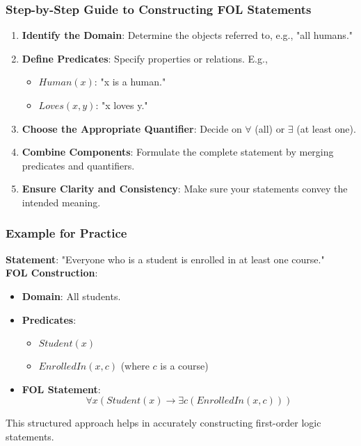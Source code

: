\documentclass[aspectratio=169]{beamer}
\begin{document}
\begin{frame}[fragile]
    \frametitle{Step-by-Step Guide to Constructing FOL Statements}
    \begin{enumerate}
        \item \textbf{Identify the Domain}: Determine the objects referred to, e.g., "all humans."
        \item \textbf{Define Predicates}: Specify properties or relations. E.g.,
        \begin{itemize}
            \item \( Human(x) \): "x is a human."
            \item \( Loves(x, y) \): "x loves y."
        \end{itemize}
        \item \textbf{Choose the Appropriate Quantifier}: Decide on \( \forall \) (all) or \( \exists \) (at least one).
        \item \textbf{Combine Components}: Formulate the complete statement by merging predicates and quantifiers.
        \item \textbf{Ensure Clarity and Consistency}: Make sure your statements convey the intended meaning.
    \end{enumerate}
\end{frame}

\begin{frame}[fragile]
    \frametitle{Example for Practice}
    \textbf{Statement}: "Everyone who is a student is enrolled in at least one course." \\
    \textbf{FOL Construction}:
    \begin{itemize}
        \item \textbf{Domain}: All students.
        \item \textbf{Predicates}:
        \begin{itemize}
            \item \( Student(x) \)
            \item \( EnrolledIn(x, c) \) (where \( c \) is a course)
        \end{itemize}
        \item \textbf{FOL Statement}:
        \begin{equation}
            \forall x (Student(x) \rightarrow \exists c (EnrolledIn(x, c)))
        \end{equation}
    \end{itemize}
    This structured approach helps in accurately constructing first-order logic statements.
\end{frame}
\end{document}
